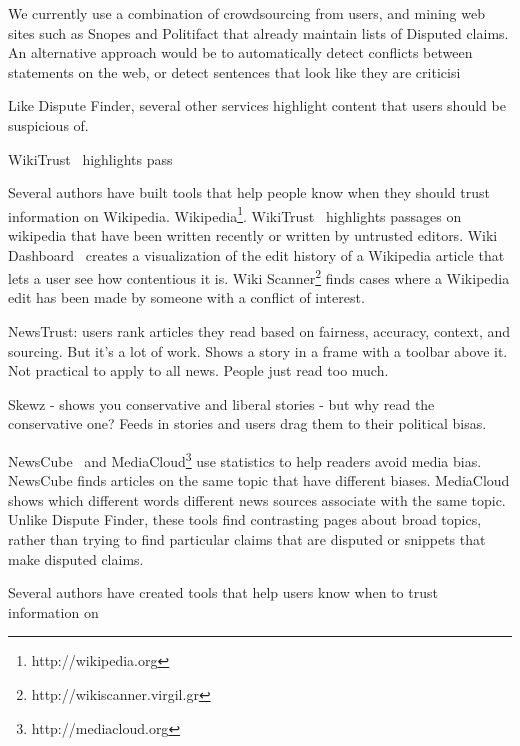  


We currently use a combination of crowdsourcing from users, and mining web sites such as Snopes and Politifact that already maintain lists of Disputed claims. An alternative approach would be to automatically detect conflicts between statements on the web, or detect sentences that look like they are criticisi 



Like Dispute Finder, several other services highlight content that users should be suspicious of. 

WikiTrust~\cite{Adler2008a} highlights pass

Several authors have built tools that help people know when they should trust information on Wikipedia. Wikipedia\footnote{http://wikipedia.org}. WikiTrust~\cite{Adler2008a} highlights passages on wikipedia that have been written recently or written by untrusted editors. Wiki Dashboard~\cite{Kittur2008} creates a visualization of the edit history of a Wikipedia article that lets a user see how contentious it is. Wiki Scanner\footnote{http://wikiscanner.virgil.gr} finds cases where a Wikipedia edit has been made by someone with a conflict of interest. 








NewsTrust: users rank articles they read based on fairness, accuracy, context, and sourcing. But it's a lot of work. Shows a story in a frame with a toolbar above it. Not practical to apply to all news. People just read too much.



Skewz - shows you conservative and liberal stories - but why read the conservative one?
Feeds in stories and users drag them to their political bisas.

NewsCube~\cite{Park2009} and MediaCloud\footnote{http://mediacloud.org} use statistics to help readers avoid media bias. NewsCube finds articles on the same topic that have different biases. MediaCloud shows which different words different news sources associate with the same topic. Unlike Dispute Finder, these tools find contrasting pages about broad topics, rather than trying to find particular claims that are disputed or snippets that make disputed claims.



Several authors have created tools that help users know when to trust information on 
% 
% 
